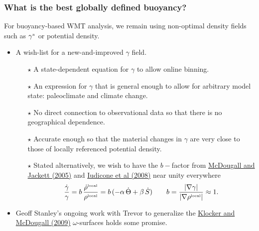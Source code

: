 \documentclass[10pt]{beamer}
\begin{document}
\begin{frame}
  \frametitle{What is the best globally defined buoyancy?}

  For buoyancy-based WMT analysis, we remain using non-optimal density
  fields such as $\gamma^{\mbox{\tiny n}}$ or potential density.

\begin{exampleblock}{}
\begin{itemize}

\item A wish-list for a new-and-improved $\gamma$ field.


\begin{itemize}  \footnotesize 
\item[$\star$] A state-dependent equation for $\gamma$ to allow online
  binning.

\item[$\star$] An expression for $\gamma$ that is general enough to
  allow for arbitrary model state: paleoclimate and climate change.

\item[$\star$] No direct connection to observational data so that
  there is no geographical dependence.

\item[$\star$] Accurate enough so that the material changes in
  $\gamma$ are very close to those of locally referenced potential
  density. 

\item[$\star$] Stated alternatively, we wish to have the $b-$factor
  from \href{https://doi.org/10.1357/0022240053693734}{McDougall and
    Jackett (2005)} and
  \href{https://journals.ametsoc.org/doi/10.1175/2007JPO3464.1}{Iudicone
    et al (2008)} near unity everywhere
\begin{equation}
   \frac{\dot{\gamma}}{\gamma} = b \, \frac{\dot{\rho}^{\mbox{\tiny local}}}{\rho^{\mbox{\tiny local}} }
   = b \, (-\alpha \, \dot{\Theta} + \beta \, \dot{S})  
  \qquad b = \frac{ | \nabla \gamma| }{ | \nabla \rho^{\mbox{\tiny local}} | } 
  \approx 1.
\end{equation}

\end{itemize}

\item Geoff Stanley's ongoing work with Trevor to generalize the
  \href{https://www.ocean-sci.net/5/155/2009/}{Klocker and McDougall
    (2009)} $\omega$-surfaces holds some promise.

\end{itemize}
\end{exampleblock}{}

\end{frame}
\end{document}
